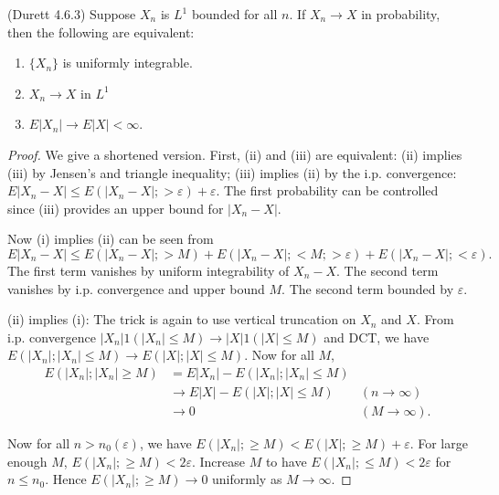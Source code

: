 \begin{theorem}
	(Durett 4.6.3)
	Suppose $X_n$ is $L^1$ bounded for all $n$. If $X_n \to  X$ in probability, then the following are equivalent: 
	\begin{enumerate}
		\item  $\{X_n\} $ is uniformly integrable.
		\item $X_n \to  X$ in $L^1$
		\item  $E|X_n| \to E|X| < \infty $.
	\end{enumerate}
\end{theorem}
\begin{proof}
	We give a shortened version. First, (ii) and (iii) are equivalent: (ii) implies (iii) by Jensen's and triangle inequality; (iii) implies (ii) by the i.p. convergence: $E|X_n - X| \le E\left( |X_n - X|; > \varepsilon \right) + \varepsilon $. The first probability can be controlled since (iii) provides an upper bound for $|X_n - X|$.

	Now (i) implies (ii) can be seen from
	 \[
		E|X_n - X| \le E\left( |X_n - X|; > M \right) 
		+ E\left( |X_n - X|; < M; > \varepsilon \right) 
		+ E\left( |X_n - X|; < \varepsilon \right) 
	.\] 
	The first term vanishes by uniform integrability of $X_n - X$. The second term vanishes by i.p. convergence and upper bound $M$. The second term bounded by $\varepsilon$.

	(ii) implies (i): The trick is again to use vertical truncation on $X_n$ and $X$. From i.p. convergence  $|X_n| 1\left( |X_n| \le M \right) \to |X| 1\left( |X| \le M \right) $ and DCT, we have $E\left( |X_n|; |X_n| \le M \right) \to E\left( |X|; |X| \le M \right) $. Now for all $M$,
	\begin{align*}
		E\left( |X_n|; |X_n| \ge M \right) 
		&= E|X_n| - E\left( |X_n|; |X_n| \le M \right)  \\
		&\to E|X| - E\left( |X|; |X| \le M \right) &(n \to \infty ) \\
		&\to 0 &(M \to \infty )
	.\end{align*}

	Now for all $n > n_0(\varepsilon)$, we have $E(|X_n|; \ge M) < E\left( |X|; \ge M \right) + \varepsilon$. For large enough $M$, $E(|X_n|; \ge M) < 2 \varepsilon$. Increase $M$ to have $E(|X_n|; \le M) < 2 \varepsilon$ for $n \le n_0$. Hence $E\left( |X_n|; \ge M \right) \to 0$ uniformly as $M \to \infty $.

\end{proof}


